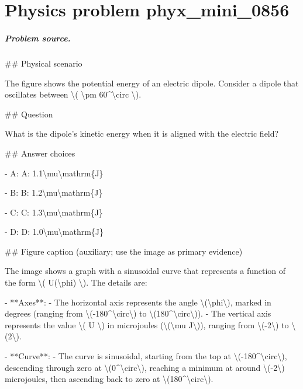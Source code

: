 
\chapter{Physics problem phyx\_mini\_0856}
\label{ch:PhyXMiniProblems_problem_phyx_mini_0856}

\paragraph{Problem source.}
\#\# Physical scenario

The figure shows the potential energy of an electric dipole. Consider a dipole that oscillates between \textbackslash{}( \textbackslash{}pm 60\textasciicircum{}\textbackslash{}circ \textbackslash{}).

\#\# Question

What is the dipole's kinetic energy when it is aligned with the electric field?

\#\# Answer choices

- A: A: 1.1\textbackslash{}mu\textbackslash{}mathrm\{J\}

- B: B: 1.2\textbackslash{}mu\textbackslash{}mathrm\{J\}

- C: C: 1.3\textbackslash{}mu\textbackslash{}mathrm\{J\}

- D: D: 1.0\textbackslash{}mu\textbackslash{}mathrm\{J\}

\#\# Figure caption (auxiliary; use the image as primary evidence)

The image shows a graph with a sinusoidal curve that represents a function of the form \textbackslash{}( U(\textbackslash{}phi) \textbackslash{}). The details are:

- **Axes**: 
  - The horizontal axis represents the angle \textbackslash{}(\textbackslash{}phi\textbackslash{}), marked in degrees (ranging from \textbackslash{}(-180\textasciicircum{}\textbackslash{}circ\textbackslash{}) to \textbackslash{}(180\textasciicircum{}\textbackslash{}circ\textbackslash{})).
  - The vertical axis represents the value \textbackslash{}( U \textbackslash{}) in microjoules (\textbackslash{}(\textbackslash{}mu J\textbackslash{})), ranging from \textbackslash{}(-2\textbackslash{}) to \textbackslash{}(2\textbackslash{}).
  
- **Curve**: 
  - The curve is sinusoidal, starting from the top at \textbackslash{}(-180\textasciicircum{}\textbackslash{}circ\textbackslash{}), descending through zero at \textbackslash{}(0\textasciicircum{}\textbackslash{}circ\textbackslash{}), reaching a minimum at around \textbackslash{}(-2\textbackslash{}) microjoules, then ascending back to zero at \textbackslash{}(180\textasciicircum{}\textbackslash{}circ\textbackslash{}).

